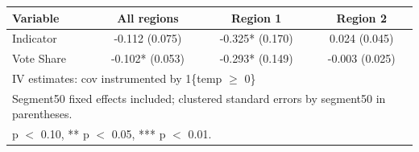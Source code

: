 \begin{tabular}{lccc}
\hline\hline
Variable & All regions & Region 1 & Region 2 \\
\hline
Indicator & -0.112 (0.075) & -0.325* (0.170) & 0.024 (0.045) \\
Vote Share & -0.102* (0.053) & -0.293* (0.149) & -0.003 (0.025) \\
\hline
\multicolumn{4}{l}{\footnotesize IV estimates: cov instrumented by 1\{temp $\ge$ 0\}} \\
\multicolumn{4}{l}{\footnotesize Segment50 fixed effects included; clustered standard errors by segment50 in parentheses.} \\
\multicolumn{4}{l}{\footnotesize * p $<$ 0.10, ** p $<$ 0.05, *** p $<$ 0.01.} \\
\hline\hline
\end{tabular}
